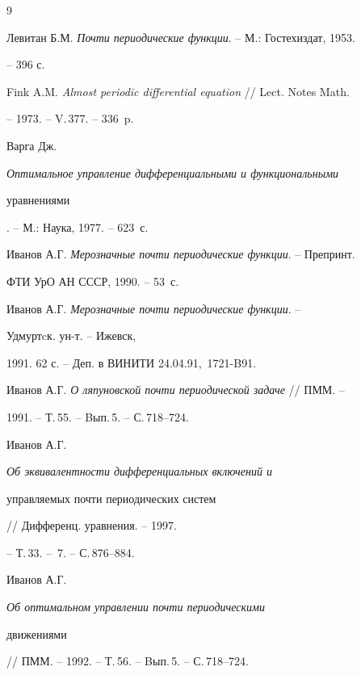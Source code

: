 \begin{thebibliography}{9}







Левитан Б.М. {\em Почти периодические функции}. -- М.: Гостехиздат, 1953.


-- 396 с.




Fink A.M. {\em Almost periodic differential equation} // Lect. Notes Math.


-- 1973. -- V.\,377. -- 336~p.




Варга Дж. {\em Оптимальное управление дифференциальными и функциональными


уравнениями}. -- М.: Наука, 1977. -- 623~с.




Иванов А.Г. {\em Мерозначные почти периодические функции}. -- Препринт.


ФТИ УрО АН СССР, 1990. -- 53~с. 




Иванов А.Г. {\em Мерозначные почти периодические функции}. --


Удмуртcк. ун-т. -- Ижевск,


1991. 62 с. -- Деп. в ВИНИТИ 24.04.91, \No\,1721-B91.




Иванов А.Г. {\em О ляпуновской почти периодической задаче} // ПММ. --


1991. -- Т.\,55. -- Bып.\,5. -- С.\,718--724.




Иванов А.Г. {\em Об эквивалентности дифференциальных включений и


управляемых почти периодических систем} // Дифференц. уравнения. -- 1997.


-- Т.\,33. -- \No\,7. -- С.\,876--884.




Иванов А.Г. {\em Об оптимальном управлении почти периодическими


движениями} // ПММ. -- 1992. -- Т.\,56. -- Bып.\,5. -- С.\,718--724.





\end{thebibliography}





\vskip 0.5cm












\label{end}





